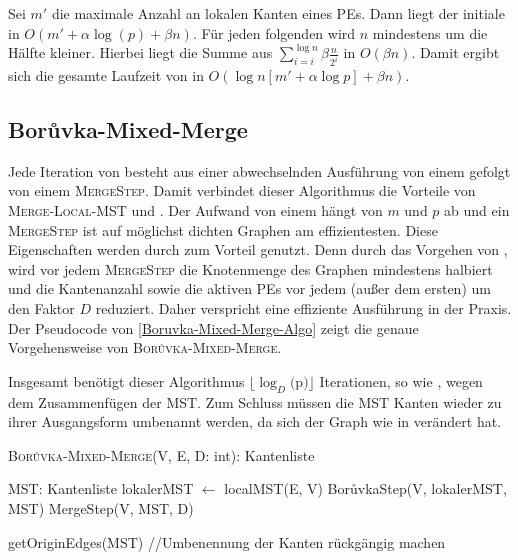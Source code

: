 Sei $m'$ die maximale Anzahl an lokalen Kanten eines PEs.
Dann liegt der initiale \boruvkaStep  in $O(m'+ \alpha \log(p)+\beta n)$.
Für jeden folgenden \boruvkaStep wird $n$ mindestens um die Hälfte kleiner. Hierbei liegt die Summe aus $\sum_{i=i}^{\log n} \beta \frac{n}{2^i}$ in $O(\beta n)$.
Damit ergibt sich die gesamte Laufzeit von \boruvkaAllreduce in $O(\log n [m' + \alpha \log p]  +\beta n)$.




\subsection{Bor{\r u}vka-Mixed-Merge}
Jede Iteration von \boruvkaMixedMerge besteht aus einer abwechselnden Ausführung von einem \boruvkaStep gefolgt von einem \textsc{MergeStep}.
Damit verbindet dieser Algorithmus die Vorteile von \textsc{Merge-Local-MST} und \boruvkaAllreduceNoSpace.
Der Aufwand von einem \boruvkaStep hängt von $m$ und $p$ ab und ein \textsc{MergeStep} ist auf möglichst dichten Graphen am effizientesten. Diese Eigenschaften werden durch \boruvkaMixedMerge zum Vorteil genutzt.
Denn durch das Vorgehen von \boruvkaMixedMerge, wird vor jedem \textsc{MergeStep} die Knotenmenge des Graphen mindestens halbiert und die Kantenanzahl sowie die aktiven PEs vor jedem (außer dem ersten) \boruvkaStep um den Faktor $D$ reduziert.
Daher verspricht \boruvkaMixedMerge eine effiziente Ausführung in der Praxis.
Der Pseudocode von \cref{Boruvka-Mixed-Merge-Algo} zeigt die genaue Vorgehensweise von \textsc{Bor{\r u}vka-Mixed-Merge}.

Insgesamt benötigt dieser Algorithmus $\lfloor \log_{D}($p$) \rfloor $ Iterationen, so wie \mergeMST, wegen dem Zusammenfügen der MST.
Zum Schluss müssen die MST Kanten wieder zu ihrer Ausgangsform umbenannt werden, da sich der Graph wie in \boruvkaAllreduce verändert hat.\\


\begin{algorithm} 
\caption{\textsc{Bor{\r u}vka-Mixed-Merge}(V, E, D: int): Kantenliste}
\begin{algorithmic}[1]
\label{Boruvka-Mixed-Merge-Algo}

\STATE MST: Kantenliste
\STATE lokalerMST $\gets$ localMST(E, V)
    \STATE Bor{\r u}vkaStep(V, lokalerMST, MST)
    \STATE MergeStep(V, MST, D)
\ENDFOR

\RETURN getOriginEdges(MST) //Umbenennung der Kanten rückgängig machen
\end{algorithmic}
\end{algorithm}


